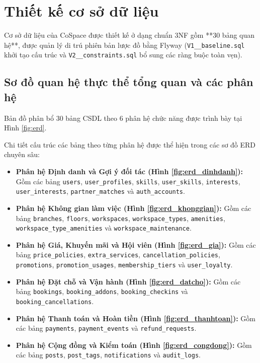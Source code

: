 
\clearpage
\section{Thiết kế cơ sở dữ liệu}
\label{sec:thietke_csdl}

Cơ sở dữ liệu của CoSpace được thiết kế ở dạng chuẩn 3NF gồm **30 bảng quan hệ**, được quản lý di trú phiên bản lược đồ bằng Flyway (\texttt{V1\_\_baseline.sql} khởi tạo cấu trúc và \texttt{V2\_\_constraints.sql} bổ sung các ràng buộc toàn vẹn).

\subsection{Sơ đồ quan hệ thực thể tổng quan và các phân hệ}
Bản đồ phân bổ 30 bảng CSDL theo 6 phân hệ chức năng được trình bày tại Hình \ref{fig:erd}.


Chi tiết cấu trúc các bảng theo từng phân hệ được thể hiện trong các sơ đồ ERD chuyên sâu:
\begin{itemize}
    \item \textbf{Phân hệ Định danh và Gợi ý đối tác (Hình \ref{fig:erd_dinhdanh}):} Gồm các bảng \texttt{users}, \texttt{user\_profiles}, \texttt{skills}, \texttt{user\_skills}, \texttt{interests}, \texttt{user\_interests}, \texttt{partner\_matches} và \texttt{auth\_accounts}.
    \item \textbf{Phân hệ Không gian làm việc (Hình \ref{fig:erd_khonggian}):} Gồm các bảng \texttt{branches}, \texttt{floors}, \texttt{workspaces}, \texttt{workspace\_types}, \texttt{amenities}, \texttt{workspace\_type\_amenities} và \texttt{workspace\_maintenance}.
    \item \textbf{Phân hệ Giá, Khuyến mãi và Hội viên (Hình \ref{fig:erd_gia}):} Gồm các bảng \texttt{price\_policies}, \texttt{extra\_services}, \texttt{cancellation\_policies}, \texttt{promotions}, \texttt{promotion\_usages}, \texttt{membership\_tiers} và \texttt{user\_loyalty}.
    \item \textbf{Phân hệ Đặt chỗ và Vận hành (Hình \ref{fig:erd_datcho}):} Gồm các bảng \texttt{bookings}, \texttt{booking\_addons}, \texttt{booking\_checkins} và \texttt{booking\_cancellations}.
    \item \textbf{Phân hệ Thanh toán và Hoàn tiền (Hình \ref{fig:erd_thanhtoan}):} Gồm các bảng \texttt{payments}, \texttt{payment\_events} và \texttt{refund\_requests}.
    \item \textbf{Phân hệ Cộng đồng và Kiểm toán (Hình \ref{fig:erd_congdong}):} Gồm các bảng \texttt{posts}, \texttt{post\_tags}, \texttt{notifications} và \texttt{audit\_logs}.
\end{itemize}


